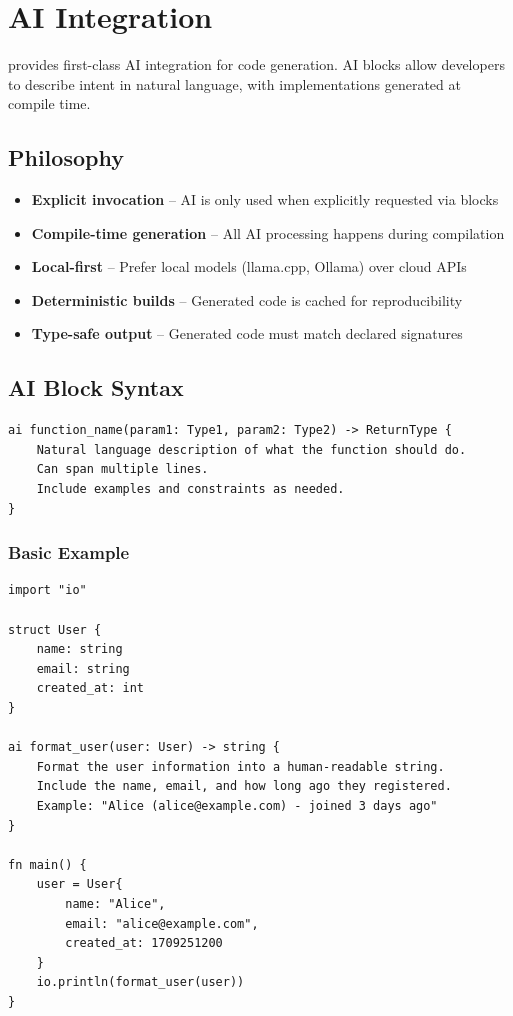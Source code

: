 \chapter{AI Integration}
\label{ch:ai}

\haira{} provides first-class AI integration for code generation. AI blocks allow developers to describe intent in natural language, with implementations generated at compile time.

\section{Philosophy}

\begin{itemize}
    \item \textbf{Explicit invocation} -- AI is only used when explicitly requested via  blocks
    \item \textbf{Compile-time generation} -- All AI processing happens during compilation
    \item \textbf{Local-first} -- Prefer local models (llama.cpp, Ollama) over cloud APIs
    \item \textbf{Deterministic builds} -- Generated code is cached for reproducibility
    \item \textbf{Type-safe output} -- Generated code must match declared signatures
\end{itemize}

\section{AI Block Syntax}

\begin{lstlisting}
ai function_name(param1: Type1, param2: Type2) -> ReturnType {
    Natural language description of what the function should do.
    Can span multiple lines.
    Include examples and constraints as needed.
}
\end{lstlisting}

\subsection{Basic Example}

\begin{lstlisting}
import "io"

struct User {
    name: string
    email: string
    created_at: int
}

ai format_user(user: User) -> string {
    Format the user information into a human-readable string.
    Include the name, email, and how long ago they registered.
    Example: "Alice (alice@example.com) - joined 3 days ago"
}

fn main() {
    user = User{
        name: "Alice",
        email: "alice@example.com",
        created_at: 1709251200
    }
    io.println(format_user(user))
}
\end{lstlisting}

